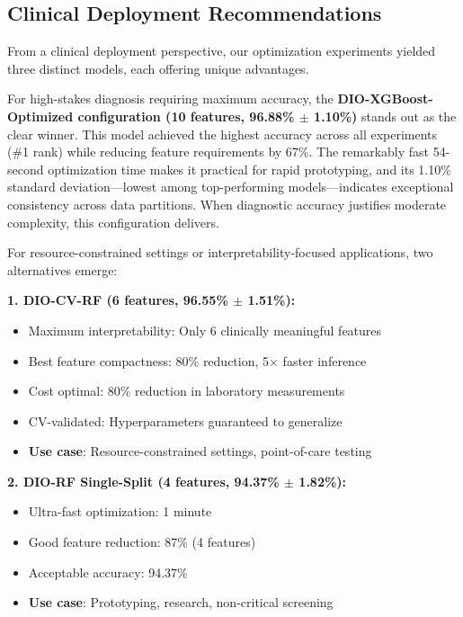 \documentclass[12pt, a4paper]{article}
\begin{document}
\subsection{Clinical Deployment Recommendations}
From a clinical deployment perspective, our optimization experiments yielded three distinct models, each offering unique advantages.

For high-stakes diagnosis requiring maximum accuracy, the \textbf{DIO-XGBoost-Optimized configuration (10 features, 96.88\% $\pm$ 1.10\%)} stands out as the clear winner. This model achieved the highest accuracy across all experiments (\#1 rank) while reducing feature requirements by 67\%. The remarkably fast 54-second optimization time makes it practical for rapid prototyping, and its 1.10\% standard deviation—lowest among top-performing models—indicates exceptional consistency across data partitions. When diagnostic accuracy justifies moderate complexity, this configuration delivers.

For resource-constrained settings or interpretability-focused applications, two alternatives emerge:

\textbf{1. DIO-CV-RF (6 features, 96.55\% $\pm$ 1.51\%):}
\begin{itemize}
    \item Maximum interpretability: Only 6 clinically meaningful features
    \item Best feature compactness: 80\% reduction, 5$\times$ faster inference
    \item Cost optimal: 80\% reduction in laboratory measurements
    \item CV-validated: Hyperparameters guaranteed to generalize
    \item \textbf{Use case}: Resource-constrained settings, point-of-care testing
\end{itemize}

\textbf{2. DIO-RF Single-Split (4 features, 94.37\% $\pm$ 1.82\%):}
\begin{itemize}
    \item Ultra-fast optimization: 1 minute
    \item Good feature reduction: 87\% (4 features)
    \item Acceptable accuracy: 94.37\%
    \item \textbf{Use case}: Prototyping, research, non-critical screening
\end{itemize}
\end{document}

